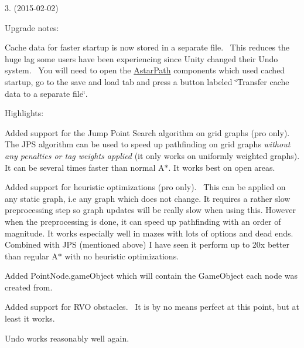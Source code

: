 \begin{DoxyItemize}
\begin{DoxyItemize}
\begin{DoxyItemize}
\end{DoxyItemize}
\end{DoxyItemize}
\item 3. (2015-\/02-\/02)
\begin{DoxyItemize}
\item Upgrade notes\+:
\begin{DoxyItemize}
\item Cache data for faster startup is now stored in a separate file.~\newline
 This reduces the huge lag some users have been experiencing since Unity changed their Undo system.~\newline
 You will need to open the \mbox{\hyperlink{class_astar_path}{Astar\+Path}} components which used cached startup, go to the save and load tab and press a button labeled \char`\"{}\+Transfer cache data to a separate file\char`\"{}.
\end{DoxyItemize}
\item Highlights\+:
\begin{DoxyItemize}
\item Added support for the Jump Point Search algorithm on grid graphs (pro only).~\newline
 The J\+PS algorithm can be used to speed up pathfinding on grid graphs {\itshape without any penalties or tag weights applied} (it only works on uniformly weighted graphs). It can be several times faster than normal A$\ast$. It works best on open areas.
\item Added support for heuristic optimizations (pro only).~\newline
 This can be applied on any static graph, i.\+e any graph which does not change. It requires a rather slow preprocessing step so graph updates will be really slow when using this. However when the preprocessing is done, it can speed up pathfinding with an order of magnitude. It works especially well in mazes with lots of options and dead ends.~\newline
 Combined with J\+PS (mentioned above) I have seen it perform up to 20x better than regular A$\ast$ with no heuristic optimizations.
\item Added Point\+Node.\+game\+Object which will contain the Game\+Object each node was created from.
\item Added support for R\+VO obstacles.~\newline
 It is by no means perfect at this point, but at least it works.
\item Undo works reasonably well again.~\newline

\end{DoxyItemize}
\end{DoxyItemize}
\end{DoxyItemize}
